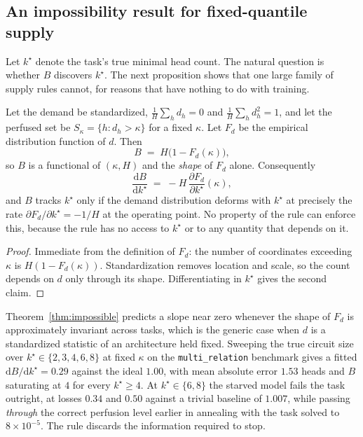 \subsection{An impossibility result for fixed-quantile supply}

Let $k^\star$ denote the task's true minimal head count. The natural question is whether
$B$ discovers $k^\star$. The next proposition shows that one large family of supply rules
cannot, for reasons that have nothing to do with training.

\begin{theorem}
\label{thm:impossible}
Let the demand be standardized, $\frac{1}{H}\sum_h d_h = 0$ and
$\frac{1}{H}\sum_h d_h^2 = 1$, and let the perfused set be
$S_\kappa = \{ h : d_h > \kappa \}$ for a fixed $\kappa$. Let $F_d$ be the empirical
distribution function of $d$. Then
\begin{equation}
  \label{eq:quantile}
  B \;=\; H\bigl(1 - F_d(\kappa)\bigr),
\end{equation}
so $B$ is a functional of $(\kappa, H)$ and the \emph{shape} of $F_d$ alone. Consequently
\begin{equation}
  \frac{\mathrm{d}B}{\mathrm{d}k^\star}
  \;=\; -H \, \frac{\partial F_d}{\partial k^\star}(\kappa),
\end{equation}
and $B$ tracks $k^\star$ only if the demand distribution deforms with $k^\star$ at
precisely the rate $\partial F_d / \partial k^\star = -1/H$ at the operating point. No
property of the rule can enforce this, because the rule has no access to $k^\star$ or to
any quantity that depends on it.
\end{theorem}

\begin{proof}
Immediate from the definition of $F_d$: the number of coordinates exceeding $\kappa$ is
$H(1 - F_d(\kappa))$. Standardization removes location and scale, so the count depends on
$d$ only through its shape. Differentiating in $k^\star$ gives the second claim.
\end{proof}

\begin{remark}
\label{rem:impossible}
Theorem~\ref{thm:impossible} predicts a slope near zero whenever the shape of $F_d$ is
approximately invariant across tasks, which is the generic case when $d$ is a
standardized statistic of an architecture held fixed. Sweeping the true circuit size over
$k^\star \in \{2,3,4,6,8\}$ at fixed $\kappa$ on the \texttt{multi\_relation} benchmark
gives a fitted $\mathrm{d}B/\mathrm{d}k^\star = 0.29$ against the ideal $1.00$, with mean
absolute error $1.53$ heads and $B$ saturating at $4$ for every $k^\star \ge 4$. At
$k^\star \in \{6,8\}$ the starved model fails the task outright, at losses $0.34$ and
$0.50$ against a trivial baseline of $1.007$, while passing \emph{through} the correct
perfusion level earlier in annealing with the task solved to $8\times 10^{-5}$. The rule
discards the information required to stop.
\end{remark}

